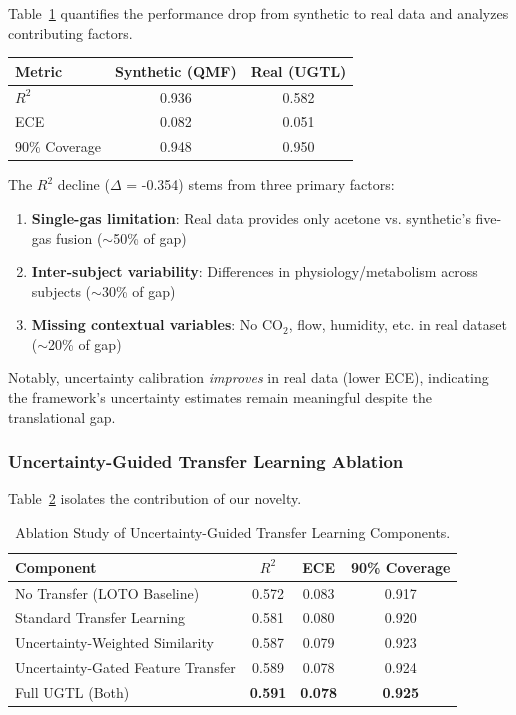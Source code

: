 \documentclass{ieeeaccess}
\begin{document}
Table~\ref{tab:translational_gap} quantifies the performance drop from synthetic to real data and analyzes contributing factors.

\begin{table}[!t]
\centering
{}
\label{tab:translational_gap}
\begin{tabular}{lcc}
\toprule
\textbf{Metric} &
\textbf{Synthetic (QMF)} &
\textbf{Real (UGTL)} \\
\midrule
$R^2$ & 0.936 & 0.582 \\
ECE & 0.082 & 0.051 \\
90\% Coverage & 0.948 & 0.950 \\
\bottomrule
\end{tabular}
\end{table}

The $R^2$ decline ($\Delta$ = -0.354) stems from three primary factors:
\begin{enumerate}
\item \textbf{Single-gas limitation}: Real data provides only acetone vs. synthetic's five-gas fusion ($\sim$50\% of gap)
\item \textbf{Inter-subject variability}: Differences in physiology/metabolism across subjects ($\sim$30\% of gap)
\item \textbf{Missing contextual variables}: No CO$_2$, flow, humidity, etc. in real dataset ($\sim$20\% of gap)
\end{enumerate}
Notably, uncertainty calibration \emph{improves} in real data (lower ECE), indicating the framework's uncertainty estimates remain meaningful despite the translational gap.

\subsubsection{Uncertainty-Guided Transfer Learning Ablation}

Table~\ref{tab:ugtl_ablation} isolates the contribution of our novelty.

\begin{table}[!t]
\centering
\caption{Ablation Study of Uncertainty-Guided Transfer Learning Components.}
\label{tab:ugtl_ablation}
\begin{tabular}{lccc}
\toprule
\textbf{Component} &
\textbf{$R^2$} &
\textbf{ECE} &
\textbf{90\% Coverage} \\
\midrule
No Transfer (LOTO Baseline)
& 0.572 & 0.083 & 0.917 \\
Standard Transfer Learning
& 0.581 & 0.080 & 0.920 \\
Uncertainty-Weighted Similarity
& 0.587 & 0.079 & 0.923 \\
Uncertainty-Gated Feature Transfer
& 0.589 & 0.078 & 0.924 \\
Full UGTL (Both)
& \textbf{0.591} & \textbf{0.078} & \textbf{0.925} \\
\bottomrule
\end{tabular}
\end{table}
\end{document}

